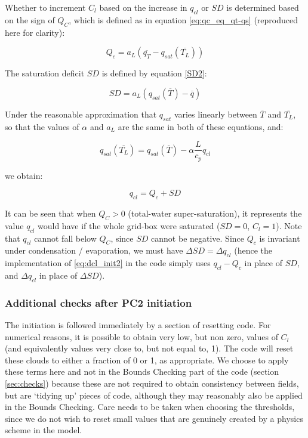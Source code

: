 \documentclass{UMDP_article}
\begin{document}
Whether to increment $C_l$ based on the increase in $q_{cl}$ or $SD$ is
determined based on the sign of $Q_C$, which is defined as in equation
\ref{eq:qc_eq_qt-qs} (reproduced here for clarity):

\[
Q_c = a_L \left( \overline{q_T} - q_{sat}(\overline{T_L}) \right)
\]

The saturation deficit $SD$ is defined by equation \ref{SD2}:

\[
SD = a_L \left( q_{sat}(\overline{T}) - \overline{q} \right)
\]

Under the reasonable approximation that $q_{sat}$ varies linearly between
$\overline{T}$ and $\overline{T_L}$, so that the values of
$\alpha$ and $a_L$ are the same in
both of these equations, and:

\[
q_{sat}(\overline{T_L}) = q_{sat}(\overline{T}) - \alpha \frac{L}{c_p} q_{cl}
\]

we obtain:

\begin{equation}
q_{cl} = Q_c + SD
\label{eq:qc_plus_sd}
\end{equation}

It can be seen that when $Q_C > 0$ (total-water super-saturation),
it represents the value $q_{cl}$ would have if the whole grid-box
were saturated ($SD = 0$, $C_l = 1$).  Note that $q_{cl}$ cannot fall below
$Q_C$, since $SD$ cannot be negative.
Since $Q_c$ is invariant under condensation / evaporation, we must have
$\Delta SD = \Delta q_{cl}$
(hence the implementation of \ref{eq:dcl_init2} in the code simply uses
$q_{cl} - Q_c$ in place of $SD$, and $\Delta q_{cl}$ in place of $\Delta SD$).

\subsubsection{Additional checks after PC2 initiation}
  \label{sec:checks2}

The initiation is followed immediately by a section of resetting code.
For numerical reasons, it is possible to obtain very low, but non zero,
values of $C_l$ (and equivalently values very close to, but not equal to,
1). The code will reset these clouds to either a fraction of 0 or 1, as
appropriate. We choose to apply these terms here and not in the
Bounds Checking part of the code (section \ref{sec:checks}) because
these are not required to obtain consistency between fields, but are
`tidying up' pieces of code, although they may reasonably also be
applied in the Bounds Checking. Care needs to be taken when choosing
the thresholds, since
we do not wish to reset small values that are genuinely created
by a physics scheme in the model.
\end{document}
